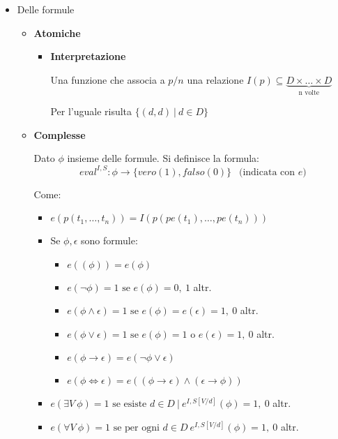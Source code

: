 \documentclass{article}
\begin{document}
\begin{itemize}
\begin{itemize}
        \end{itemize}

    \item Delle formule
            \begin{itemize}
                \item \textbf{Atomiche}
                        \begin{itemize}
                \item \textbf{Interpretazione}

                    Una funzione che associa a $p/n$ una relazione $I(p)\subseteq \underbrace{D\times\ldots\times D}_{\text{n volte}}$


                    Per l'uguale risulta $\{(d,d)\ |\ d\in D\}$
                
            \end{itemize}
            \item \textbf{Complesse}

                Dato $\phi$ insieme delle formule. Si definisce la formula:
                $$eval^{I,S}:\phi\rightarrow \{vero(1),falso(0)\}\ \ \text{ (indicata con }e)$$ 

                Come:
                \begin{itemize}
                    \item $e(p(t_1,\ldots,t_n))=I(p(pe(t_1),\ldots,pe(t_n)))$
                    \item Se $\phi, \epsilon$ sono formule:
                        \begin{itemize}
                            \item $e((\phi))=e(\phi)$
                            \item $e(\neg\phi)=1\text{ se }e(\phi)=0,\ 1$ altr.
                            \item $e(\phi\wedge\epsilon)=1\text{ se }e(\phi)=e(\epsilon)=1,\ 0$ altr.
                            \item $e(\phi\vee\epsilon)=1\text{ se }e(\phi)=1 \text{ o }e(\epsilon)=1,\ 0$ altr.
                            \item $e(\phi\rightarrow\epsilon)=e(\neg\phi\vee \epsilon)$
                            \item $e(\phi\iff\epsilon)=e((\phi\rightarrow\epsilon)\wedge(\epsilon\rightarrow\phi))$
                        \end{itemize}

                    \item $e(\exists V\ \phi)=1\text{ se esiste }d\in D\ |\ e^{I,S[V/d]}(\phi)=1,\ 0$ altr.

                    \item $e(\forall V\ \phi)=1\text{ se per ogni }d\in D\ e^{I,S[V/d]}(\phi)=1,\ 0$ altr.
                            
                \end{itemize}
             
        \end{itemize}

\end{itemize}
\end{document}
